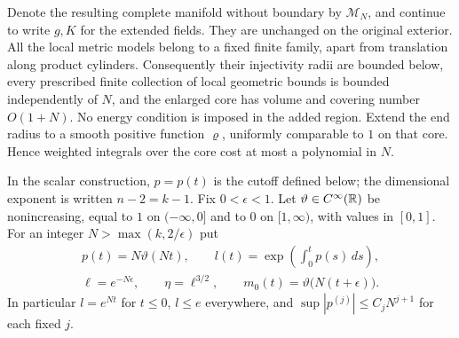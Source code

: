 Denote the resulting complete manifold without boundary by
$\mathcal M_N$, and continue to write $g,K$ for the extended fields.
They are unchanged on the original exterior.  All the local metric
models belong to a fixed finite family, apart from translation along
product cylinders.  Consequently their injectivity radii are bounded
below, every prescribed finite collection of local geometric bounds
is bounded independently of $N$, and the enlarged core has volume and
covering number $O(1+N)$.  No energy condition is imposed in the added
region.  Extend the end radius to a smooth positive function $\varrho$,
uniformly comparable to $1$ on that core.  Hence weighted integrals
over the core cost at most a polynomial in $N$.

In the scalar construction, $p=p(t)$ is the cutoff defined below;
the dimensional exponent is written $n-2=k-1$.
Fix $0<\epsilon<1$.  Let $\vartheta\in C^\infty(\mathbb R)$ be nonincreasing,
equal to $1$ on $(-\infty,0]$ and to $0$ on $[1,\infty)$, with values
in $[0,1]$.  For an integer $N>\max(k,2/\epsilon)$ put
\begin{equation}
 \begin{gathered}
 p(t)=N\vartheta(Nt),\qquad
 l(t)=\exp\left(\int_0^t p(s)\,ds\right),\\
 \ell=e^{-N\epsilon},\qquad \eta=\ell^{3/2},\qquad
 m_0(t)=\vartheta\bigl(N(t+\epsilon)\bigr).
 \end{gathered}
 \label{eq:scalar:parameters}
\end{equation}
In particular $l=e^{Nt}$ for $t\leq0$, $l\leq e$ everywhere, and
$\sup|p^{(j)}|\leq C_jN^{j+1}$ for each fixed $j$.

